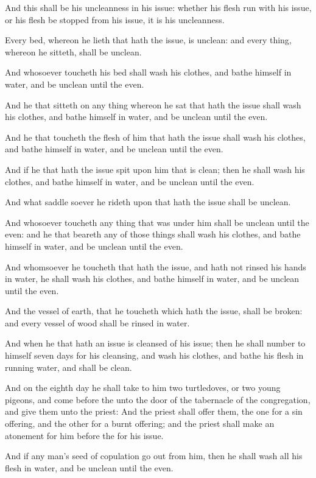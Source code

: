 \verse And this shall be his uncleanness in his issue: whether his flesh run with his issue, or his flesh be stopped from his issue, it is his uncleanness.

\verse Every bed, whereon he lieth that hath the issue, is unclean: and every thing, whereon he sitteth, shall be unclean.

\verse And whosoever toucheth his bed shall wash his clothes, and bathe himself in water, and be unclean until the even.

\verse And he that sitteth on any thing whereon he sat that hath the issue shall wash his clothes, and bathe himself in water, and be unclean until the even.

\verse And he that toucheth the flesh of him that hath the issue shall wash his clothes, and bathe himself in water, and be unclean until the even.

\verse And if he that hath the issue spit upon him that is clean; then he shall wash his clothes, and bathe himself in water, and be unclean until the even.

\verse And what saddle soever he rideth upon that hath the issue shall be unclean.

\verse And whosoever toucheth any thing that was under him shall be unclean until the even: and he that beareth any of those things shall wash his clothes, and bathe himself in water, and be unclean until the even.

\verse And whomsoever he toucheth that hath the issue, and hath not rinsed his hands in water, he shall wash his clothes, and bathe himself in water, and be unclean until the even.

\verse And the vessel of earth, that he toucheth which hath the issue, shall be broken: and every vessel of wood shall be rinsed in water.

\verse And when he that hath an issue is cleansed of his issue; then he shall number to himself seven days for his cleansing, and wash his clothes, and bathe his flesh in running water, and shall be clean.

\verse And on the eighth day he shall take to him two turtledoves, or two young pigeons, and come before the \LORD unto the door of the tabernacle of the congregation, and give them unto the priest: \verse And the priest shall offer them, the one for a sin offering, and the other for a burnt offering; and the priest shall make an atonement for him before the \LORD for his issue.

\verse And if any man's seed of copulation go out from him, then he shall wash all his flesh in water, and be unclean until the even.

